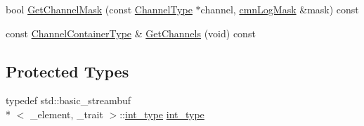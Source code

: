 \begin{DoxyCompactItemize}
\item 
bool \hyperlink{classcmn_l_o_d_multiplexer_streambuf_a12522abcbc62cea5e20d821e66f15eb9}{Get\-Channel\-Mask} (const \hyperlink{classcmn_l_o_d_multiplexer_streambuf_aa3b0347701c1aa5157a719978a1a6386}{Channel\-Type} $\ast$channel, \hyperlink{cmn_log_lo_d_8h_a44b6ef7560b0d204460b0a54f1a5d702}{cmn\-Log\-Mask} \&mask) const 
\item 
const \hyperlink{classcmn_l_o_d_multiplexer_streambuf_a2fd9fe59de3be9b8cf5546ac2b0e41bb}{Channel\-Container\-Type} \& \hyperlink{classcmn_l_o_d_multiplexer_streambuf_ad141a1587b36db6be88a1199e2441a36}{Get\-Channels} (void) const 
\end{DoxyCompactItemize}
\subsection*{Protected Types}
\begin{DoxyCompactItemize}
\item 
typedef std\-::basic\-\_\-streambuf\\*
$<$ \-\_\-element, \-\_\-trait $>$\-::\hyperlink{classcmn_l_o_d_multiplexer_streambuf_a8d1eadc5cf72b594aa2c2fef6401fe47}{int\-\_\-type} \hyperlink{classcmn_l_o_d_multiplexer_streambuf_a8d1eadc5cf72b594aa2c2fef6401fe47}{int\-\_\-type}
\end{DoxyCompactItemize}
